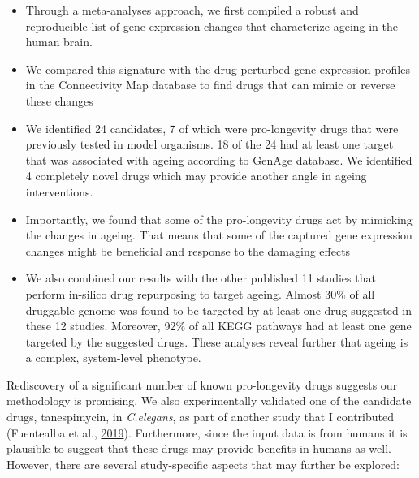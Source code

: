 \documentclass[12pt,twoside]{unicam}
\providecommand{\tightlist}{%
  \setlength{\itemsep}{0pt}\setlength{\parskip}{0pt}}
\begin{document}
\begin{itemize}
\tightlist
\item
  Through a meta-analyses approach, we first compiled a robust and reproducible list of gene expression changes that characterize ageing in the human brain.
\item
  We compared this signature with the drug-perturbed gene expression profiles in the Connectivity Map database to find drugs that can mimic or reverse these changes
\item
  We identified 24 candidates, 7 of which were pro-longevity drugs that were previously tested in model organisms. 18 of the 24 had at least one target that was associated with ageing according to GenAge database. We identified 4 completely novel drugs which may provide another angle in ageing interventions.
\item
  Importantly, we found that some of the pro-longevity drugs act by mimicking the changes in ageing. That means that some of the captured gene expression changes might be beneficial and response to the damaging effects
\item
  We also combined our results with the other published 11 studies that perform in-silico drug repurposing to target ageing. Almost 30\% of all druggable genome was found to be targeted by at least one drug suggested in these 12 studies. Moreover, 92\% of all KEGG pathways had at least one gene targeted by the suggested drugs. These analyses reveal further that ageing is a complex, system-level phenotype.
\end{itemize}

Rediscovery of a significant number of known pro-longevity drugs suggests our methodology is promising. We also experimentally validated one of the candidate drugs, tanespimycin, in \emph{C.elegans}, as part of another study that I contributed (Fuentealba et al., \protect\hyperlink{ref-Fuentealba2019}{2019}). Furthermore, since the input data is from humans it is plausible to suggest that these drugs may provide benefits in humans as well. However, there are several study-specific aspects that may further be explored:
\end{document}
